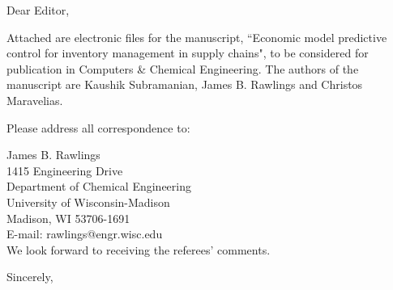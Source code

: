 \documentclass[10pt]{letter}
\begin{document}
\date{\today}
\address{James B. Rawlings\\
  1415 Engineering Drive \\
  Department of Chemical Engineering \\
  University of Wisconsin-Madison \\
  Madison, WI 53706-1691}
\signature{James B. Rawlings}
\begin{letter}{}

\opening{Dear Editor,}

Attached are electronic files for the manuscript, ``Economic model
predictive control for inventory management in supply chains", to be considered for publication in Computers \& Chemical Engineering. The authors of the 
manuscript are Kaushik Subramanian, James B. Rawlings and  Christos Maravelias.

Please address all correspondence to:

James B. Rawlings \\
1415 Engineering Drive \\
Department of Chemical Engineering \\
University of Wisconsin-Madison \\
Madison, WI 53706-1691\\
E-mail: rawlings@engr.wisc.edu \\

We look forward to receiving the referees' comments.

\closing{Sincerely,}
\end{letter}
\end{document}
